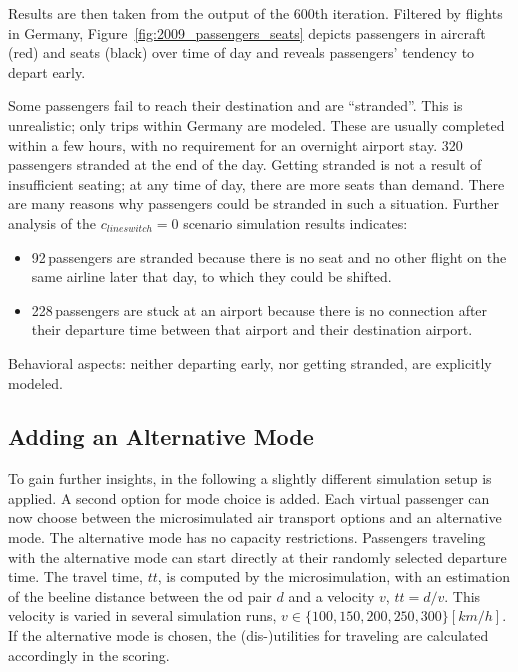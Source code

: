 
Results are then taken from the output of the 600th iteration. 
Filtered by flights in Germany, Figure~\ref{fig:2009_passengers_seats} depicts passengers in aircraft (red) and seats (black) over time of day
and reveals passengers' tendency to depart early. 

Some passengers fail to reach their destination and are ``stranded''.   
This is unrealistic; only trips within Germany are modeled. These are usually completed within a few hours, with no requirement for an overnight airport stay. 
320\,passengers stranded at the end of the day. 
Getting stranded is not a result of insufficient seating; at any time of day, there are more seats than demand.  
%
There are many reasons why passengers could be stranded in such a situation.
%
Further analysis of the $c_{lineswitch} = 0$ scenario simulation results indicates:
\begin{itemize}\styleItemize
\item 92\,passengers are stranded because there is no seat and no other flight on the same airline later that day, to which they could be shifted.
\item 228\,passengers are stuck at an airport because there is no connection after their departure time 
	between that airport and their destination airport. 
\end{itemize}

Behavioral aspects: neither departing early, nor getting stranded, are explicitly modeled.  

\subsection{Adding an Alternative Mode}
To gain further insights, in the following a slightly different simulation setup is applied. 
A second option for mode choice is added. 
Each virtual passenger can now choose between the microsimulated air transport options and an alternative mode. 
The alternative mode has no capacity restrictions. 
Passengers traveling with the alternative mode can start directly at their randomly selected departure time. 
The travel time, $tt$, is computed by the \gls{microsimulation}, with an estimation of the beeline distance between the \gls{od} pair $d$ and a velocity $v$, \ie $tt = d / v$.  
This velocity is varied in several simulation runs, \ie $v \in \{100, 150, 200, 250, 300 \} [km/h]$. 
If the alternative mode is chosen, the (dis-)utilities for traveling are calculated accordingly in the scoring.  

